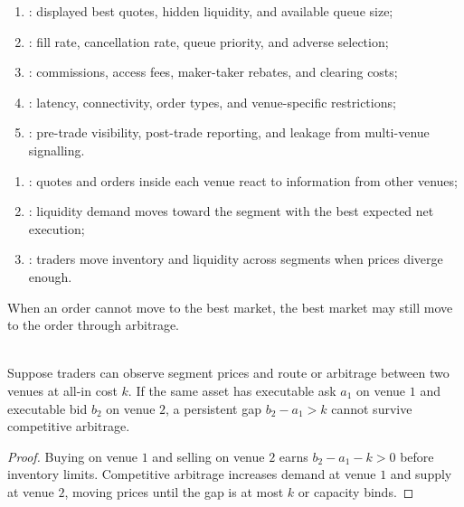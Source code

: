 \documentclass[a4paper,oneside,openany]{book}
\begin{document}
\begin{taxonomy} 
\begin{enumerate}[label=\roman*.]
\setlength{\itemsep}{0pt}
\item {}: displayed best quotes, hidden liquidity, and available queue size;
\item {}: fill rate, cancellation rate, queue priority, and adverse selection;
\item {}: commissions, access fees, maker-taker rebates, and clearing costs;
\item {}: latency, connectivity, order types, and venue-specific restrictions;
\item {}: pre-trade visibility, post-trade reporting, and leakage from multi-venue signalling.
\end{enumerate}
\end{taxonomy}

\begin{mechanism} 
\begin{enumerate}[label=\roman*.]
\setlength{\itemsep}{0pt}
\item {}: quotes and orders inside each venue react to information from other venues;
\item {}: liquidity demand moves toward the segment with the best expected net execution;
\item {}: traders move inventory and liquidity across segments when prices diverge enough.
\end{enumerate}
When an order cannot move to the best market, the best market may still move to the order through arbitrage.
\end{mechanism}

\begin{proposition} \\
Suppose traders can observe segment prices and route or arbitrage between two venues at all-in cost $k$. If the same asset has executable ask $a_1$ on venue $1$ and executable bid $b_2$ on venue $2$, a persistent gap $b_2-a_1>k$ cannot survive competitive arbitrage.
\begin{proof}
Buying on venue $1$ and selling on venue $2$ earns $b_2-a_1-k>0$ before inventory limits. Competitive arbitrage increases demand at venue $1$ and supply at venue $2$, moving prices until the gap is at most $k$ or capacity binds.
\end{proof}
\end{proposition}
\end{document}

